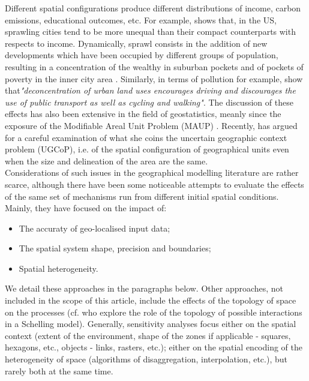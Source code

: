 \documentclass[Royal,sageh,times]{sagej}
\begin{document}
Different spatial configurations produce different distributions of income, carbon emissions, educational outcomes, etc. For example, \citet{wheeler2006urban} shows that, in the US, sprawling cities tend to be more unequal than their compact counterparts with respects to income. Dynamically, sprawl consists in the addition of new developments which have been occupied by different groups of population, resulting in a concentration of the wealthy in suburban pockets and of pockets of poverty in the inner city area \citep{jargowsky2002sprawl}. Similarly, in terms of pollution for example, \citet[p.173]{schwanen2001travel} show that{\it "deconcentration of urban land uses encourages driving and discourages the use of public transport as well as cycling and walking"}. The discussion of these effects has also been extensive in the field of geostatistics, meanly since the exposure of the Modifiable Areal Unit Problem (MAUP) \citep{Openshaw1984, FotheringhamWong1991}. Recently, \citet{Kwan2012} has argued for a careful examination of what she coins the uncertain geographic context problem (UGCoP), i.e. of the spatial configuration of geographical units even when the size and delineation of the area are the same.\\

Considerations of such issues in the geographical modelling literature are rather scarce, although there have been some noticeable attempts to evaluate the effects of the same set of mechanisms run from different initial spatial conditions. Mainly, they have focused on the impact of:
\begin{itemize}
\item The accuraty of geo-localised input data;
\item The spatial system shape, precision and boundaries;
\item Spatial heterogeneity.
\end{itemize}
We detail these approaches in the paragraphs below. Other approaches, not included in the scope of this article, include the effects of the topology of space on the processes (cf. \citet{moreno2009integrating} who explore the role of the topology of possible interactions in a Schelling model). Generally, sensitivity analyses focus either on the spatial context (extent of the environment, shape of the zones if applicable - squares, hexagons, etc., objects - links, rasters, etc.); either on the spatial encoding of the heterogeneity of space (algorithms of disaggregation, interpolation, etc.), but rarely both at the same time.
\end{document}
